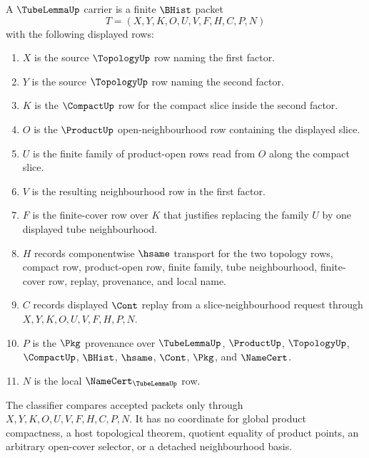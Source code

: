 \begin{definition}
\label{def:tube-lemma-carrier}
A $\TubeLemmaUp$ carrier is a finite $\BHist$ packet
$$
T=(X,Y,K,O,U,V,F,H,C,P,N)
$$
with the following displayed rows:
\begin{enumerate}
\item $X$ is the source $\TopologyUp$ row naming the first factor.
\item $Y$ is the source $\TopologyUp$ row naming the second factor.
\item $K$ is the $\CompactUp$ row for the compact slice inside the second factor.
\item $O$ is the $\ProductUp$ open-neighbourhood row containing the displayed slice.
\item $U$ is the finite family of product-open rows read from $O$ along the compact slice.
\item $V$ is the resulting neighbourhood row in the first factor.
\item $F$ is the finite-cover row over $K$ that justifies replacing the family $U$ by one displayed tube neighbourhood.
\item $H$ records componentwise $\hsame$ transport for the two topology rows, compact row, product-open row, finite family, tube neighbourhood, finite-cover row, replay, provenance, and local name.
\item $C$ records displayed $\Cont$ replay from a slice-neighbourhood request through $X,Y,K,O,U,V,F,H,P,N$.
\item $P$ is the $\Pkg$ provenance over $\TubeLemmaUp$, $\ProductUp$, $\TopologyUp$, $\CompactUp$, $\BHist$, $\hsame$, $\Cont$, $\Pkg$, and $\NameCert$.
\item $N$ is the local $\NameCert_{\TubeLemmaUp}$ row.
\end{enumerate}
The classifier compares accepted packets only through $X,Y,K,O,U,V,F,H,C,P,N$. It has no coordinate for global product compactness, a host topological theorem, quotient equality of product points, an arbitrary open-cover selector, or a detached neighbourhood basis.
\end{definition}

